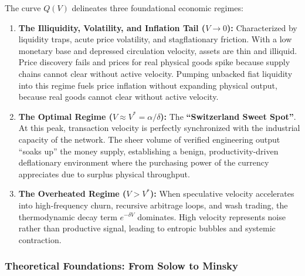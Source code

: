 \documentclass[a4paper,11pt,twoside,parskip=half-,headings=small]{scrartcl}
\begin{document}
The curve $Q(V)$ delineates three foundational economic regimes:
\begin{enumerate}
  \item \textbf{The Illiquidity, Volatility, and Inflation Tail ($V \to 0$):} Characterized by liquidity traps, acute price volatility, and stagflationary friction. With a low monetary base and depressed circulation velocity, assets are thin and illiquid. Price discovery fails and prices for real physical goods spike because supply chains cannot clear without active velocity. Pumping unbacked fiat liquidity into this regime fuels price inflation without expanding physical output, because real goods cannot clear without active velocity.
  \item \textbf{The Optimal Regime ($V \approx V^* = \alpha/\delta$):} The \textbf{``Switzerland Sweet Spot''}. At this peak, transaction velocity is perfectly synchronized with the industrial capacity of the network. The sheer volume of verified engineering output ``soaks up'' the money supply, establishing a benign, productivity-driven deflationary environment where the purchasing power of the currency appreciates due to surplus physical throughput.
  \item \textbf{The Overheated Regime ($V > V^*$):} When speculative velocity accelerates into high-frequency churn, recursive arbitrage loops, and wash trading, the thermodynamic decay term $e^{-\delta V}$ dominates. High velocity represents noise rather than productive signal, leading to entropic bubbles and systemic contraction.
\end{enumerate}

\subsubsection{Theoretical Foundations: From Solow to Minsky}
\label{sec:velotility_math}
\end{document}
